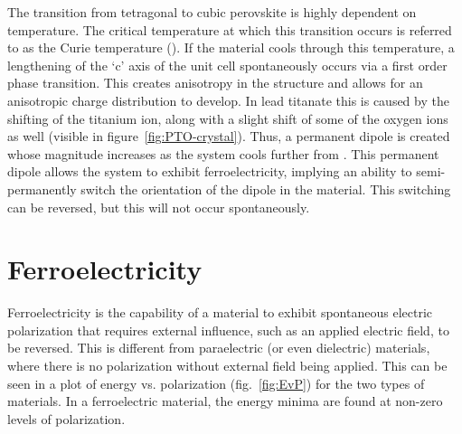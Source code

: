 The transition from tetragonal to cubic perovskite is highly dependent on temperature. The critical temperature at which this transition occurs is referred to as the Curie temperature (\Tc{}). If the material cools through this temperature, a lengthening of the `c' axis of the unit cell spontaneously occurs via a first order phase transition. This creates anisotropy in the structure and allows for an anisotropic charge distribution to develop. In lead titanate this is caused by the shifting of the titanium ion, along with a slight shift of some of the oxygen ions as well (visible in figure~\vref{fig:PTO-crystal}). Thus, a permanent dipole is created whose magnitude increases as the system cools further from \Tc{}. This permanent dipole allows the system to exhibit ferroelectricity, implying an ability to semi-permanently switch the orientation of the dipole in the material. This switching can be reversed, but this will not occur spontaneously. 



\section{Ferroelectricity}
\label{sec:Materials-Ferro}

Ferroelectricity is the capability of a material to exhibit spontaneous electric polarization that requires external influence, such as an applied electric field, to be reversed. This is different from paraelectric (or even dielectric) materials, where there is no polarization without external field being applied. This can be seen in a plot of energy vs. polarization (fig.~\vref{fig:EvP}) for the two types of materials. In a ferroelectric material, the energy minima are found at non-zero levels of polarization. 

